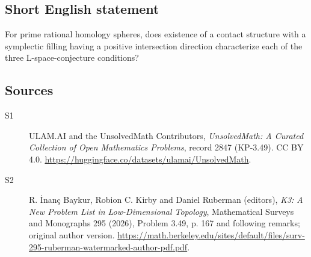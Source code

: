 \documentclass[11pt]{article}
\begin{document}
\subsection{Short English statement}
For prime rational homology spheres, does existence of a contact structure with a symplectic filling having a positive intersection direction characterize each of the three L-space-conjecture conditions?
\subsection{Sources}
\begin{description}
\item[\hypertarget{source:2847:1}{S1}] ULAM.AI and the UnsolvedMath Contributors, \emph{UnsolvedMath: A Curated Collection of Open Mathematics Problems}, record 2847 (KP-3.49). CC BY 4.0. \url{https://huggingface.co/datasets/ulamai/UnsolvedMath}.
\item[\hypertarget{source:2847:2}{S2}] R. İnanç Baykur, Robion C. Kirby and Daniel Ruberman (editors), \emph{K3: A New Problem List in Low-Dimensional Topology}, Mathematical Surveys and Monographs 295 (2026), Problem 3.49, p. 167 and following remarks; original author version. \url{https://math.berkeley.edu/sites/default/files/surv-295-ruberman-watermarked-author-pdf.pdf}.
\end{description}
\label{end:2847}
\end{document}
